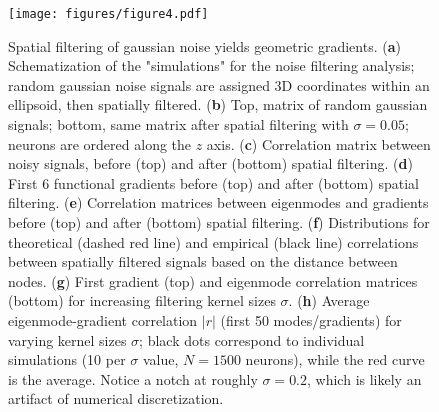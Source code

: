 \documentclass{article}
\begin{document}
\begin{figure}[t]
    \centering
    \texttt{[image: figures/figure4.pdf]}
    \caption{Spatial filtering of gaussian noise yields geometric gradients. (\textbf{a}) Schematization of the "simulations" for the noise filtering analysis; random gaussian noise signals are assigned 3D coordinates within an ellipsoid, then spatially filtered. (\textbf{b}) Top, matrix of random gaussian signals; bottom, same matrix after spatial filtering with $\sigma=0.05$; neurons are ordered along the $z$ axis. (\textbf{c}) Correlation matrix between noisy signals, before (top) and after (bottom) spatial filtering. (\textbf{d}) First 6 functional gradients before (top) and after (bottom) spatial filtering. (\textbf{e}) Correlation matrices between eigenmodes and gradients before (top) and after (bottom) spatial filtering. (\textbf{f}) Distributions for theoretical (dashed red line) and empirical (black line) correlations between spatially filtered signals based on the distance between nodes. (\textbf{g}) First gradient (top) and eigenmode correlation matrices (bottom) for increasing filtering kernel sizes $\sigma$. (\textbf{h}) Average eigenmode-gradient correlation $|r|$ (first 50 modes/gradients) for varying kernel sizes $\sigma$; black dots correspond to individual simulations (10 per $\sigma$ value, $N=1500$ neurons), while the red curve is the average. Notice a notch at roughly $\sigma=0.2$, which is likely an artifact of numerical discretization.}
    \label{fig4}
    \hrulefill
\end{figure}
\end{document}
